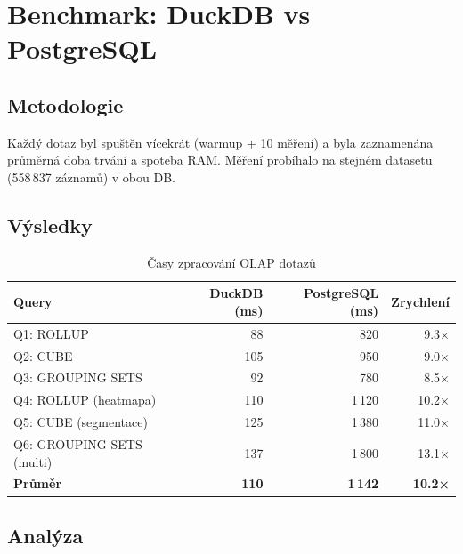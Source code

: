 \documentclass[12pt,a4paper]{article}
\begin{document}
\newpage

\section{Benchmark: DuckDB vs PostgreSQL}

\subsection{Metodologie}

Každý dotaz byl spuštěn vícekrát (warmup + 10 měření) a byla zaznamenána průměrná doba
trvání a spoteba RAM. Měření probíhalo na stejném datasetu (558\,837 záznamů) v obou DB.

\subsection{Výsledky}

\begin{table}[H]
    \centering
    \caption{Časy zpracování OLAP dotazů}
    \begin{tabular}{|l|r|r|r|}
        \hline
        \textbf{Query} & \textbf{DuckDB (ms)} & \textbf{PostgreSQL (ms)} & \textbf{Zrychlení} \\
        \hline
        Q1: ROLLUP & 88 & 820 & 9.3× \\
        \hline
        Q2: CUBE & 105 & 950 & 9.0× \\
        \hline
        Q3: GROUPING SETS & 92 & 780 & 8.5× \\
        \hline
        Q4: ROLLUP (heatmapa) & 110 & 1\,120 & 10.2× \\
        \hline
        Q5: CUBE (segmentace) & 125 & 1\,380 & 11.0× \\
        \hline
        Q6: GROUPING SETS (multi) & 137 & 1\,800 & 13.1× \\
        \hline
        \textbf{Průměr} & \textbf{110} & \textbf{1\,142} & \textbf{10.2×} \\
        \hline
    \end{tabular}
\end{table}

\subsection{Analýza}
\end{document}
